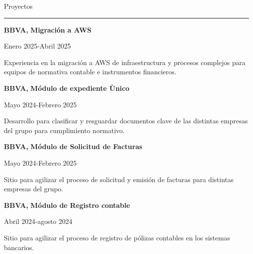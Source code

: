 \documentclass{article}
\begin{document}
\begin{minipage}[t]{0.60\textwidth}  %
\setlength{\baselineskip}{0.1\baselineskip}
\vspace{0.5cm}  %

{\large Proyectos}
\rule{\linewidth}{0.4pt}

\vspace{0.2cm}

\large \textbf{BBVA, }
\large \textbf{Migración a AWS}

{\small Enero 2025-Abril 2025}

{\small Experiencia en la migración a AWS de infraestructura y procesos complejos para equipos de normativa contable e instrumentos financieros.}

\vspace{0.5cm}

\large \textbf{BBVA, }
\large \textbf{Módulo de expediente Ùnico}

{\small Mayo 2024-Febrero 2025}

{\small Desarrollo para clasificar y resguardar documentos clave de las distintas empresas del grupo para cumplimiento normativo.}

\vspace{0.5cm}

\large \textbf{BBVA, }
\large \textbf{Módulo de Solicitud de Facturas}

{\small Mayo 2024-Febrero 2025}

{\small Sitio para agilizar el proceso de solicitud y emisión de facturas para distintas empresas del grupo.}

\vspace{0.5cm}

\large \textbf{BBVA, }
\large \textbf{Módulo de Registro contable}

{\small Abril 2024-agosto 2024}

{\small Sitio para agilizar el proceso de registro de pólizas contables en los sistemas bancarios.}

\vspace{0.5cm}

\end{minipage}
\end{document}
